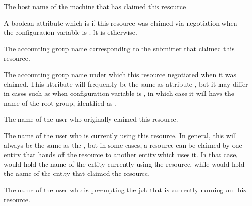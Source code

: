 \begin{description}

\item[\AdAttr{ClientMachine}:] The host name of the machine that has
claimed this resource

\item[\AdAttr{RemoteAutoregroup}:]  A boolean attribute which is 
if this resource was claimed via negotiation 
when the configuration variable  is .
It is  otherwise.

\item[\AdAttr{RemoteGroup}:]  The accounting group name corresponding to
the submitter that claimed this resource.

\item[\AdAttr{RemoteNegotiatingGroup}:]  The accounting group name under
which this resource negotiated when it was claimed.  This attribute will
frequently be the same as attribute ,
but it may differ in cases such
as when configuration variable  is ,
in which case it will have the name of the root group, 
identified as .

\item[\AdAttr{RemoteOwner}:] The name of the user who originally
claimed this resource.

\item[\AdAttr{RemoteUser}:] The name of the user who is currently
using this resource.
In general, this will always be the same as the ,
but in some cases, a resource can be claimed by one entity that hands
off the resource to another entity which uses it.
In that case,  would hold the name of the entity
currently using the resource, while  would hold
the name of the entity that claimed the resource.

\item[\AdAttr{PreemptingOwner}:] The name of the user who is preempting
the job that is currently running on this resource.


\end{description}
